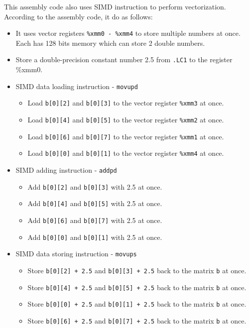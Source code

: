 \documentclass[12pt, a4paper]{article}
\begin{document}
            This assembly code also uses SIMD instruction to perform vectorization.
            According to the assembly code, it do as follows:
            \begin{itemize}
                \item It uses vector registers \texttt{\%xmm0 - \%xmm4} to store multiple numbers at once.
                Each has 128 bits memory which can store 2 double numbers.
                \item Store a double-precision constant number 2.5 from \texttt{.LC1} to the register {\%xmm0}.
                \item SIMD data loading instruction - \texttt{movupd}
                \begin{itemize}
                    \item Load \texttt{b[0][2]} and \texttt{b[0][3]} to the vector register \texttt{\%xmm3} at once.
                    \item Load \texttt{b[0][4]} and \texttt{b[0][5]} to the vector register \texttt{\%xmm2} at once.
                    \item Load \texttt{b[0][6]} and \texttt{b[0][7]} to the vector register \texttt{\%xmm1} at once.
                    \item Load \texttt{b[0][0]} and \texttt{b[0][1]} to the vector register \texttt{\%xmm4} at once.
                \end{itemize}

                \item SIMD adding instruction - \texttt{addpd}
                \begin{itemize}
                    \item Add \texttt{b[0][2]} and \texttt{b[0][3]} with 2.5 at once.
                    \item Add \texttt{b[0][4]} and \texttt{b[0][5]} with 2.5 at once.
                    \item Add \texttt{b[0][6]} and \texttt{b[0][7]} with 2.5 at once.
                    \item Add \texttt{b[0][0]} and \texttt{b[0][1]} with 2.5 at once.
                \end{itemize}

                \item SIMD data storing instruction - \texttt{movups}
                \begin{itemize}
                    \item Store \texttt{b[0][2] + 2.5} and \texttt{b[0][3] + 2.5} back to the matrix \texttt{b} at once.
                    \item Store \texttt{b[0][4] + 2.5} and \texttt{b[0][5] + 2.5} back to the matrix \texttt{b} at once.
                    \item Store \texttt{b[0][0] + 2.5} and \texttt{b[0][1] + 2.5} back to the matrix \texttt{b} at once.
                    \item Store \texttt{b[0][6] + 2.5} and \texttt{b[0][7] + 2.5} back to the matrix \texttt{b} at once.
                \end{itemize}
            \end{itemize}
\end{document}
